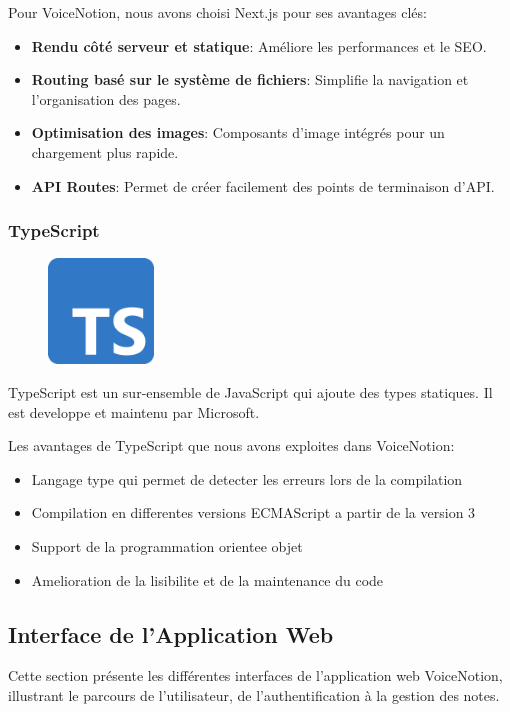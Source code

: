 Pour VoiceNotion, nous avons choisi Next.js pour ses avantages clés:
\begin{itemize}
    \item \textbf{Rendu côté serveur et statique}: Améliore les performances et le SEO.
    \item \textbf{Routing basé sur le système de fichiers}: Simplifie la navigation et l'organisation des pages.
    \item \textbf{Optimisation des images}: Composants d'image intégrés pour un chargement plus rapide.
    \item \textbf{API Routes}: Permet de créer facilement des points de terminaison d'API.
\end{itemize}

\subsubsection{TypeScript}
\begin{figure}
    \centering
    \includegraphics[width=0.25\textwidth]{assets/docs/typescript.png}
\end{figure}
TypeScript est un sur-ensemble de JavaScript qui ajoute des types statiques. Il est developpe et maintenu par Microsoft.

Les avantages de TypeScript que nous avons exploites dans VoiceNotion:
\begin{itemize}
    \item Langage type qui permet de detecter les erreurs lors de la compilation
    \item Compilation en differentes versions ECMAScript a partir de la version 3
    \item Support de la programmation orientee objet
    \item Amelioration de la lisibilite et de la maintenance du code
\end{itemize}

\subsection{Interface de l'Application Web}
Cette section présente les différentes interfaces de l'application web VoiceNotion, illustrant le parcours de l'utilisateur, de l'authentification à la gestion des notes.

